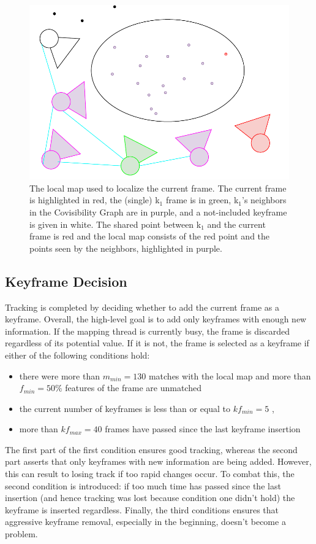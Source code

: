 \documentclass[a4paper, 10pt]{article}
\begin{document}
\begin{figure}[htbp]
\centering
\includegraphics[width=0.5\linewidth]{./resources/local-map.pdf}
\caption{\label{fig:orgbf8dbd9}
The local map used to localize the current frame. The current frame is highlighted in red, the (single) k\(_{\text{1}}\) frame is in green, k\(_{\text{1}}\)'s neighbors in the Covisibility Graph are in purple, and a not-included keyframe is given in white. The shared point between k\(_{\text{1}}\) and the current frame is red and the local map consists of the red point and the points seen by the neighbors, highlighted in purple.}
\end{figure}

\subsection{Keyframe Decision}
\label{sec:org7ede62f}
Tracking is completed by deciding whether to add the current frame as a keyframe. Overall, the high-level goal is to add only keyframes with enough new information.
If the mapping thread is currently busy, the frame is discarded regardless of its potential value. If it is not, the frame is selected as a keyframe if either of the following conditions hold:
\begin{itemize}
\item there were more than \(m_{min}=130\) matches with the local map and more than \(f_{min}=50\%\) features of the frame are unmatched
\item the current number of keyframes is less than or equal to \(kf_{min}=5\) ,
\item more than \(kf_{max}=40\) frames have passed since the last keyframe insertion
\end{itemize}
The first part of the first condition ensures good tracking, whereas the second part asserts that only keyframes with new information are being added.
However, this can result to losing track if too rapid changes occur. To combat this, the second condition is introduced: if too much time has passed since the last insertion (and hence tracking was lost because condition one didn't
hold) the keyframe is inserted regardless. Finally, the third conditions ensures that aggressive keyframe removal, especially in the beginning, doesn't become a problem.
\end{document}
